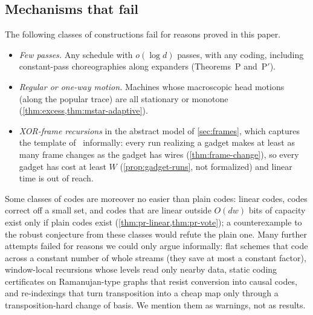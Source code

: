 \subsection{Mechanisms that fail}

The following classes of constructions fail for reasons proved in this paper.
\begin{itemize}[leftmargin=2em]
\item \emph{Few passes.} Any schedule with $o(\log d)$ passes, with any coding, including constant-pass
choreographies along expanders (Theorems~P and~P$'$).
\item \emph{Regular or one-way motion.} Machines whose macroscopic head motions (along the popular trace) are all
stationary or monotone (\cref{thm:excess,thm:mstar-adaptive}).
\item \emph{XOR-frame recursions} in the abstract model of \cref{sec:frames}, which captures the template
of~\cite{OpenAI2026mult} informally: every run realizing a gadget makes at least as many frame changes as the gadget has wires (\cref{thm:frame-change}), so every gadget has cost at least $W$ (\cref{prop:gadget-runs}, not formalized) and linear time is out of reach.
\end{itemize}
Some classes of codes are moreover no easier than plain codes: linear codes, codes correct off a small set, and codes
that are linear outside $O(dw)$ bits of capacity exist only if plain codes exist (\cref{thm:pr-linear,thm:pr-vote});
a counterexample to the robust conjecture from these classes would refute the plain one.
Many further attempts failed for reasons we could only argue informally: flat schemes that code across a constant
number of whole streams (they save at most a constant factor), window-local recursions whose levels read only
nearby data, static coding certificates on Ramanujan-type graphs that resist conversion into causal codes, and
re-indexings that turn transposition into a cheap map only through a transposition-hard change of basis. We
mention them as warnings, not as results.
